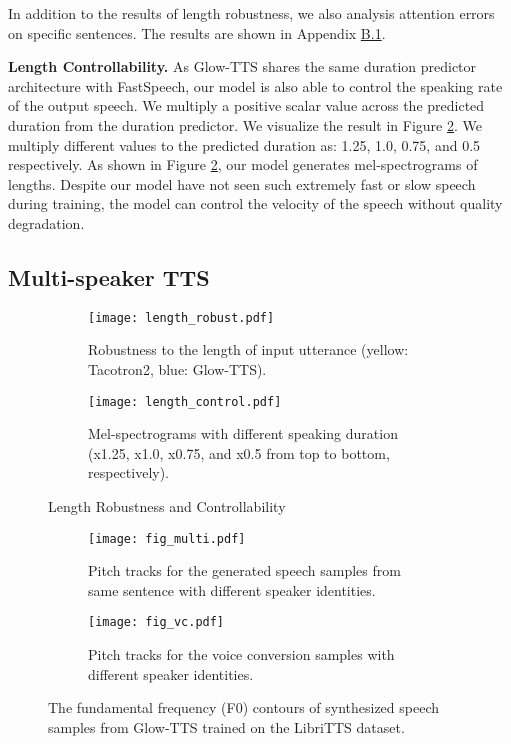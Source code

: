 \documentclass{article}
\begin{document}
In addition to the results of length robustness, we also analysis attention errors on specific sentences. The results are shown in Appendix \hyperref[appb1]{B.1}.

\textbf{Length Controllability.}
As Glow-TTS shares the same duration predictor architecture with FastSpeech, our model is also able to control the speaking rate of the output speech. We multiply a positive scalar value across the predicted duration from the duration predictor. We visualize the result in Figure \ref{lengthcontrol}. We multiply different values to the predicted duration as: 1.25, 1.0, 0.75, and 0.5 respectively. As shown in Figure \ref{lengthcontrol}, our model generates mel-spectrograms of lengths. Despite our model have not seen such extremely fast or slow speech during training, the model can control the velocity of the speech without quality degradation.

\subsection{Multi-speaker TTS}

\begin{figure}
\begin{subfigure}{\linewidth}
\texttt{[image: length\_robust.pdf]}
\caption{Robustness to the length of input utterance (yellow: Tacotron2, blue: Glow-TTS).} \label{robust}
\end{subfigure}
\hspace*{\fill} 
\begin{subfigure}{\linewidth}
\texttt{[image: length\_control.pdf]}
\caption{Mel-spectrograms with different speaking duration (x1.25, x1.0, x0.75, and x0.5 from top to bottom, respectively).} \label{lengthcontrol}
\end{subfigure}
\caption{Length Robustness and Controllability} \label{length}
\end{figure}



\begin{figure*}
\begin{subfigure}{0.49\textwidth}
\texttt{[image: fig\_multi.pdf]}
\caption{Pitch tracks for the generated speech samples from same sentence with different speaker identities.} \label{fig_multi}
\end{subfigure}
\hspace*{\fill}
\begin{subfigure}{0.49\textwidth}
\texttt{[image: fig\_vc.pdf]}
\caption{Pitch tracks for the voice conversion samples with different speaker identities.} \label{fig_vc}
\end{subfigure}
\caption{The fundamental frequency (F0) contours of synthesized speech samples from Glow-TTS trained on the LibriTTS dataset.} \label{fig:multi}
\end{figure*}
\end{document}
